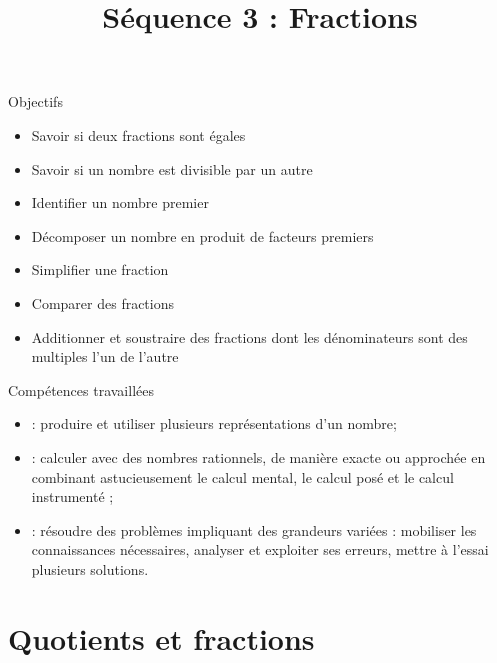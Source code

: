 \documentclass[xcolor={dvipsnames}]{beamer}
\title{Séquence 3 : Fractions}
\begin{document}
\begin{frame}
  \titlepage 
\end{frame}


	

\begin{frame}
	\begin{block}{Objectifs}
		\begin{itemize}
			
			\item Savoir si deux fractions sont égales
			\item Savoir si un nombre est divisible par un autre
			\item Identifier un nombre premier
			\item Décomposer un nombre en produit de facteurs premiers
			\item Simplifier une fraction
			\item Comparer des fractions
			\item Additionner et soustraire des fractions dont les dénominateurs sont des multiples l’un de l’autre
			
			\end{itemize}
	\end{block}
\end{frame}

\begin{frame}
	\begin{block}{Compétences travaillées}
		\begin{itemize}
			\item {} :  produire et utiliser plusieurs représentations d’un nombre;
			\item {} :  calculer avec des nombres rationnels, de manière exacte ou approchée en combinant astucieusement le calcul mental, le calcul posé et le calcul instrumenté ;
			\item {} :  résoudre des problèmes impliquant des grandeurs variées : mobiliser les connaissances nécessaires, analyser et exploiter ses erreurs, mettre à l’essai plusieurs solutions.		
		\end{itemize}
	\end{block}
\end{frame}



\section{Quotients et fractions}
\end{document}
